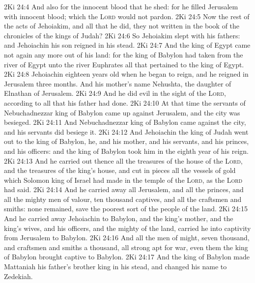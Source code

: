 \vs 2Ki 24:4 And also for the innocent blood that he shed: for he filled Jerusalem with innocent blood; which the \textsc{Lord} would not pardon.
\vs 2Ki 24:5 Now the rest of the acts of Jehoiakim, and all that he did,  they not written in the book of the chronicles of the kings of Judah?
\vs 2Ki 24:6 So Jehoiakim slept with his fathers: and Jehoiachin his son reigned in his stead.
\vs 2Ki 24:7 And the king of Egypt came not again any more out of his land: for the king of Babylon had taken from the river of Egypt unto the river Euphrates all that pertained to the king of Egypt.
\vs 2Ki 24:8 Jehoiachin  eighteen years old when he began to reign, and he reigned in Jerusalem three months. And his mother's name  Nehushta, the daughter of Elnathan of Jerusalem.
\vs 2Ki 24:9 And he did  evil in the sight of the \textsc{Lord}, according to all that his father had done.
\vs 2Ki 24:10 At that time the servants of Nebuchadnezzar king of Babylon came up against Jerusalem, and the city was besieged.
\vs 2Ki 24:11 And Nebuchadnezzar king of Babylon came against the city, and his servants did besiege it.
\vs 2Ki 24:12 And Jehoiachin the king of Judah went out to the king of Babylon, he, and his mother, and his servants, and his princes, and his officers: and the king of Babylon took him in the eighth year of his reign.
\vs 2Ki 24:13 And he carried out thence all the treasures of the house of the \textsc{Lord}, and the treasures of the king's house, and cut in pieces all the vessels of gold which Solomon king of Israel had made in the temple of the \textsc{Lord}, as the \textsc{Lord} had said.
\vs 2Ki 24:14 And he carried away all Jerusalem, and all the princes, and all the mighty men of valour,  ten thousand captives, and all the craftsmen and smiths: none remained, save the poorest sort of the people of the land.
\vs 2Ki 24:15 And he carried away Jehoiachin to Babylon, and the king's mother, and the king's wives, and his officers, and the mighty of the land,  carried he into captivity from Jerusalem to Babylon.
\vs 2Ki 24:16 And all the men of might,  seven thousand, and craftsmen and smiths a thousand, all  strong  apt for war, even them the king of Babylon brought captive to Babylon.
\vs 2Ki 24:17 And the king of Babylon made Mattaniah his father's brother king in his stead, and changed his name to Zedekiah.
